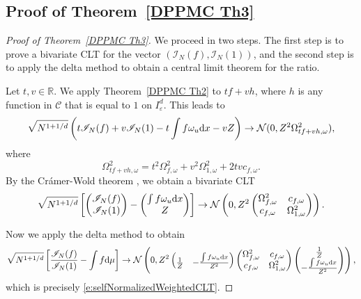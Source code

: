 \documentclass[a4paper,11pt]{article}
\numberwithin{equation}{section}
\theoremstyle{definition}
\newcommand{\rev}[1]{#1}
\renewcommand{\epsilon}{\varepsilon}
\renewcommand{\d}{ {\rm d}}
\begin{document}
\subsection{Proof of Theorem~\ref{DPPMC Th3}}
\label{proofSelfnormal}
\begin{proof}[Proof of Theorem~\ref{DPPMC Th3}]
\rev{
We proceed in two steps. The first step is to prove a bivariate CLT for the vector $(\mathscr{I}_N(f), \mathscr{I}_N(1))$, and the second step is to apply the delta method to obtain a central limit theorem for the ratio.
}

\rev{
Let $t,v\in\mathbb{R}$. We apply Theorem~\ref{DPPMC Th2} to $tf + vh$, where $h$ is any function in $\mathscr C$ that is equal to $1$ on $I_\epsilon^d$. This leads to
  $$\sqrt{N^{1+1/d}}\left(t\mathscr{I}_N(f) +v\mathscr{I}_N(1) - t\int f\omega_u\d x - vZ\right) \rightarrow \mathcal N(0,Z^2\Omega_{tf+vh,\omega}^2),$$
  where
  $$ \Omega_{tf+vh,\omega}^2 = t^2\Omega_{f,\omega}^2 + v^2 \Omega_{1,\omega}^2 + 2tv c_{f,\omega}.$$
  By the Cr\'amer-Wold theorem \cite[Corollary 5.5]{Kal06}, we obtain a bivariate CLT
  $$
  \sqrt{N^{1+1/d}}\left[\begin{pmatrix} \mathscr{I}_N(f)\\ \mathscr{I}_N(1)\end{pmatrix} - \begin{pmatrix}\int f \omega_u \d x\\ Z\end{pmatrix}\right] \rightarrow \mathcal N\left(0,Z^2\begin{pmatrix} \Omega_{f,\omega}^2 & c_{f,\omega} \\ c_{f,\omega} & \Omega_{1,\omega}^2\end{pmatrix} \right).
  $$
  }
\rev{
Now we apply the delta method \cite[Section 7.1.3]{Sch12} to obtain
$$
\sqrt{N^{1+1/d}}\left[\frac{\mathscr{I}_N(f)}{\mathscr{I}_N(1)} - \int f\d \mu\right] \rightarrow \mathcal{N}\left(0, Z^2 \begin{pmatrix}\frac1Z &-\frac{\int f\omega_u\d x}{Z^2}\end{pmatrix} \begin{pmatrix} \Omega_{f,\omega}^2 & c_{f,\omega} \\ c_{f,\omega} & \Omega_{1,\omega}^2\end{pmatrix} \begin{pmatrix}\frac1Z \\-\frac{\int f\omega_u\d x}{Z^2}\end{pmatrix}\right),
$$
which is precisely \eqref{e:selfNormalizedWeightedCLT}.
}
\end{proof}
\end{document}
